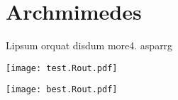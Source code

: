 \documentclass[12pt]{article}
\begin{document}
\section{Archmimedes}

Lipsum orquat disdum more4. asparrg

\texttt{[image: test.Rout.pdf]}

\texttt{[image: best.Rout.pdf]}
\end{document}
